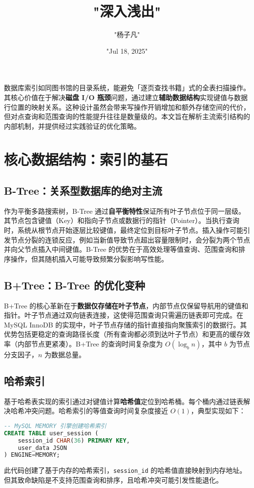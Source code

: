 \title{"深入浅出"}
\author{"杨子凡"}
\date{"Jul 18, 2025"}
\maketitle
数据库索引如同图书馆的目录系统，能避免「逐页查找书籍」式的全表扫描操作。其核心价值在于解决\textbf{磁盘 I/O 瓶颈}问题，通过建立\textbf{辅助数据结构}实现键值与数据行位置的映射关系。这种设计虽然会带来写操作开销增加和额外存储空间的代价，但对点查询和范围查询的性能提升往往是数量级的。本文旨在解析主流索引结构的内部机制，并提供经过实践验证的优化策略。\par
\chapter{核心数据结构：索引的基石}
\section{B-Tree：关系型数据库的绝对主流}
作为平衡多路搜索树，B-Tree 通过\textbf{自平衡特性}保证所有叶子节点位于同一层级。其节点包含键值（Key）和指向子节点或数据行的指针（Pointer）。当执行查询时，系统从根节点开始逐层比较键值，最终定位到目标叶子节点。插入操作可能引发节点分裂的连锁反应，例如当新值导致节点超出容量限制时，会分裂为两个节点并向父节点插入中间键值。B-Tree 的优势在于高效处理等值查询、范围查询和排序操作，但其随机插入可能导致频繁分裂影响写性能。\par
\section{B+Tree：B-Tree 的优化变种}
B+Tree 的核心革新在于\textbf{数据仅存储在叶子节点}，内部节点仅保留导航用的键值和指针。叶子节点通过双向链表连接，这使得范围查询只需遍历链表即可完成。在 MySQL InnoDB 的实现中，叶子节点存储的指针直接指向聚簇索引的数据行。其优势包括更稳定的查询路径长度（所有查询都必须到达叶子节点）和更高的缓存效率（内部节点更紧凑）。B+Tree 的查询时间复杂度为 $O(\log_b n)$，其中 $b$ 为节点分支因子，$n$ 为数据总量。\par
\section{哈希索引}
基于哈希表实现的索引通过对键值计算\textbf{哈希值}定位到哈希桶。每个桶内通过链表解决哈希冲突问题。哈希索引的等值查询时间复杂度接近 $O(1)$，典型实现如下：\par
\begin{lstlisting}[language=sql]
-- MySQL MEMORY 引擎创建哈希索引
CREATE TABLE user_session (
    session_id CHAR(36) PRIMARY KEY,
    user_data JSON
) ENGINE=MEMORY;
\end{lstlisting}
此代码创建了基于内存的哈希索引，\texttt{session\_{}id} 的哈希值直接映射到内存地址。但其致命缺陷是不支持范围查询和排序，且哈希冲突可能引发性能退化。\par
